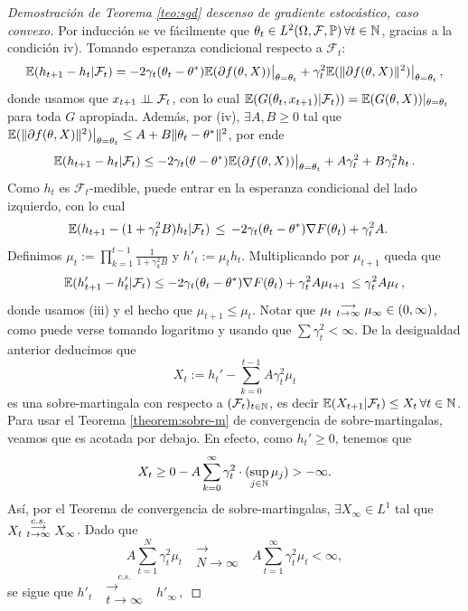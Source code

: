 \begin{proof}[Demostración de Teorema \ref{teo:sgd} descenso de gradiente estocástico, caso convexo]
Por inducci\'on se ve f\'acilmente  que  $\theta_t\in L^2(\Omega,\mathcal{F},\mathbb{P})\,\forall t\in\mathbb{N}$, gracias a la condici\'on iv). Tomando esperanza condicional respecto a $\mathcal{F}_t$:
$$ \mathbb{E}(h_{t+1}-h_t|\mathcal{F}_t)  = -2\gamma_t(\theta_t-\theta^*)\mathbb{E}(\partial f(\theta,X))\big\vert_{\theta = \theta_t}  +\gamma_t^2\mathbb{E}(\|\partial f(\theta,X)\|^2)\big\vert_{\theta = \theta_t} \,,$$
donde usamos que $x_{t+1}\perp \!\!\! \perp \mathcal{F}_t$, con lo cual $\mathbb{E}( G(\theta_t,x_{t+1})|\mathcal{F}_t)) = \mathbb{E}(G(\theta,X))\vert_{\theta = \theta_t}$ para toda $G$ apropiada. Además, por (iv),  $\exists A,B\geq 0$ tal que $\mathbb{E}(\|\partial f(\theta,X)\|^2)\big\vert_{\theta = \theta_t} \leq A+B\|\theta_t-\theta^*\|^2$, por ende
$$ \mathbb{E}(h_{t+1}-h_t|\mathcal{F}_t) \leq -2\gamma_t(\theta-\theta^*)\mathbb{E}(\partial f(\theta,X))\big\vert_{\theta=\theta_t} +A\gamma_t^2+B\gamma_t^2 h_t \,.$$
Como $h_t$ es $\mathcal{F}_t$-medible, puede entrar en la esperanza condicional del lado izquierdo, con lo cual 
\begin{alignat*}{2}
\mathbb{E}(h_{t+1}-(1+\gamma_t^2 B)h_t|\mathcal{F}_t) & \, \leq \, -2\gamma_t(\theta_t-\theta^*)\nabla F(\theta_t)+\gamma_t^2 A .
\end{alignat*}
 Definimos $\mu_t:=\displaystyle\prod^{t-1}_{k=1}\frac{1}{1+\gamma_k^2B}$ y $h'_t:=\mu_th_t$. Multiplicando por $\mu_{t+1}$ queda que
$$ \mathbb{E}(h'_{t+1}-h_t'|\mathcal{F}_t)\leq -2\gamma_t(\theta_t-\theta^*)\nabla F(\theta_t) + \gamma_t^2A\mu_{t+1}   \, \leq \gamma_t^2A\mu_{t} \,,   $$
donde usamos (iii) y el hecho que $\mu_{t+1}\leq \mu_t $. Notar que $\mu_t \mbox{ }\substack{\longrightarrow \\ t\to\infty}\mbox{ } \mu_\infty\in(0,\infty)$, como puede verse tomando logaritmo y usando que $\sum\gamma_t^2<\infty$. De la desigualdad anterior deducimos que
$$ X_t:=h_t'-\displaystyle\sum^{t-1}_{k=0}A\gamma_t^2\mu_t$$
es una sobre-martingala con respecto a $(\mathcal{F}_t)_{t\in\mathbb{N}}$, es decir $\mathbb{E}(X_{t+1}|\mathcal{F}_t)\leq X_t\,\forall t\in\mathbb{N}$. Para usar el Teorema \ref{theorem:sobre-m} de convergencia de  sobre-martingalas, veamos que es acotada por debajo. En efecto, como $h_t'\geq 0$, tenemos que 
$$ X_t \geq 0 - \displaystyle A\sum^\infty_{k=0}\gamma_t^2\cdot(\sup_{j\in\mathbb{N}}\mu_j)>-\infty.  $$
Así, por el Teorema de convergencia de  sobre-martingalas, 
 $\exists X_\infty\in L^1$ tal que $X_t\mbox{ }\overset{c.s.}{\substack{\longrightarrow \\t \to \infty}}\mbox{ } X_\infty$. Dado que 
 $$A\sum^N_{t=1}\gamma_t^2\mu_t \mbox{ }\substack{\longrightarrow \\ N\to\infty}\mbox{ } A\sum^\infty_{t=1}\gamma_t^2\mu_t <\infty, $$ se sigue que
$ h'_t \mbox{ }\overset{c.s.}{\substack{\longrightarrow \\t \to \infty}}\mbox{ } h'_\infty \,,$

\end{proof}
